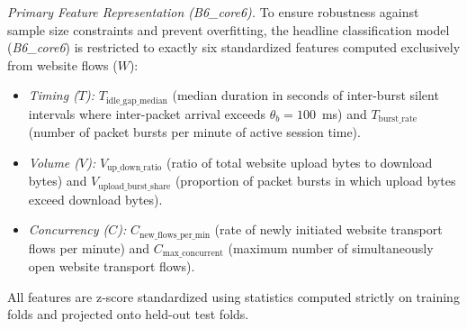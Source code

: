 \textit{Primary Feature Representation (B6\_core6).}
To ensure robustness against sample size constraints and prevent overfitting, the headline classification model (\textit{B6\_core6}) is restricted to exactly six standardized features computed exclusively from website flows ($W$):
\begin{itemize}
    \item \textit{Timing ($T$):} $T_{\text{idle\_gap\_median}}$ (median duration in seconds of inter-burst silent intervals where inter-packet arrival exceeds $\theta_b = 100$~ms) and $T_{\text{burst\_rate}}$ (number of packet bursts per minute of active session time).
    \item \textit{Volume ($V$):} $V_{\text{up\_down\_ratio}}$ (ratio of total website upload bytes to download bytes) and $V_{\text{upload\_burst\_share}}$ (proportion of packet bursts in which upload bytes exceed download bytes).
    \item \textit{Concurrency ($C$):} $C_{\text{new\_flows\_per\_min}}$ (rate of newly initiated website transport flows per minute) and $C_{\text{max\_concurrent}}$ (maximum number of simultaneously open website transport flows).
\end{itemize}
All features are z-score standardized using statistics computed strictly on training folds and projected onto held-out test folds.

